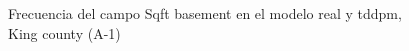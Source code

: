 \begin{figure}[H]
    \centering
    
    \caption{Frecuencia del campo Sqft basement en el modelo real y tddpm, King county (A-1)}
    \label{frecuency-tddpm-sqft basement}
\end{figure}